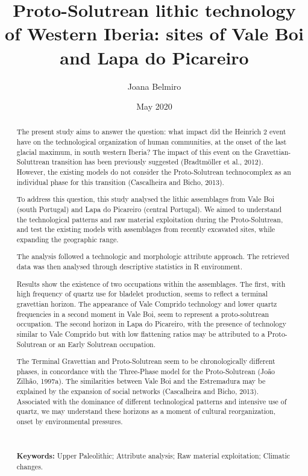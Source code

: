 \documentclass[12pt,twoside]{reedthesis}
\title{Proto-Solutrean lithic technology of Western Iberia: sites of Vale Boi and Lapa do Picareiro}
\author{Joana Belmiro}
\date{May 2020}
\begin{document}
  \maketitle

\frontmatter %


  \begin{abstract}
    The present study aims to answer the question: what impact did the Heinrich 2 event have on the technological organization of human communities, at the onset of the last glacial maximum, in south western Iberia? The impact of this event on the Gravettian-Soluttrean transition has been previously suggested (Bradtmöller et al., 2012). However, the existing models do not consider the Proto-Solutrean technocomplex as an individual phase for this transition (Cascalheira and Bicho, 2013).
    
    \par
    
    To address this question, this study analysed the lithic assemblages from Vale Boi (south Portugal) and Lapa do Picareiro (central Portugal). We aimed to understand the technological patterns and raw material exploitation during the Proto-Solutrean, and test the existing models with assemblages from recently excavated sites, while expanding the geographic range.
    
    The analysis followed a technologic and morphologic attribute approach. The retrieved data was then analysed through descriptive statistics in R environment.
    
    Results show the existence of two occupations within the assemblages. The first, with high frequency of quartz use for bladelet production, seems to reflect a terminal gravettian horizon. The appearance of Vale Comprido technology and lower quartz frequencies in a second moment in Vale Boi, seem to represent a proto-solutrean occupation. The second horizon in Lapa do Picareiro, with the presence of technology similar to Vale Comprido but with low flattening ratios may be attributed to a Proto-Solutrean or an Early Solutrean occupation.
    
    The Terminal Gravettian and Proto-Solutrean seem to be chronologically different phases, in concordance with the Three-Phase model for the Proto-Solutrean (João Zilhão, 1997a). The similarities between Vale Boi and the Estremadura may be explained by the expansion of social networks (Cascalheira and Bicho, 2013). Associated with the dominance of different technological patterns and intensive use of quartz, we may understand these horizons as a moment of cultural reorganization, onset by environmental pressures.
    
    ~
    
    \textbf{Keywords:} Upper Paleolithic; Attribute analysis; Raw material exploitation; Climatic changes.
  \end{abstract}
\end{document}
